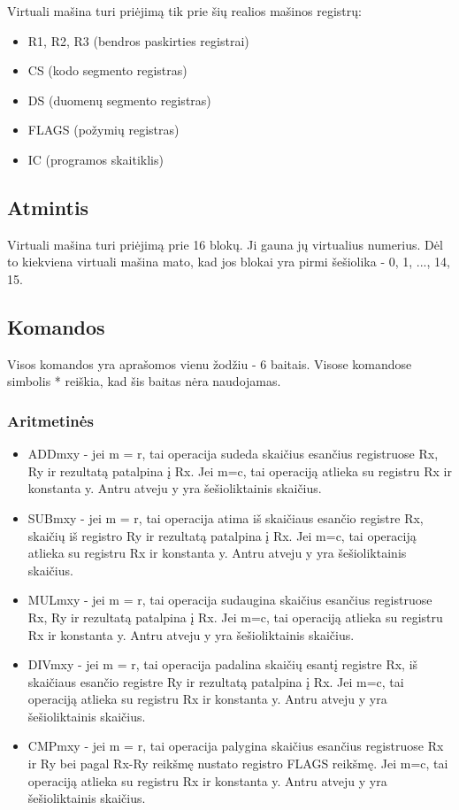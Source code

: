 \documentclass{VUMIFInfKursinis}
\begin{document}
Virtuali mašina turi priėjimą tik prie šių realios mašinos registrų:

\begin{itemize}
	\item R1, R2, R3 (bendros paskirties registrai)
	\item CS (kodo segmento registras)
	\item DS (duomenų segmento registras)
	\item FLAGS (požymių registras)
	\item IC (programos skaitiklis)
\end{itemize}

\subsection{Atmintis}

Virtuali mašina turi priėjimą prie 16 blokų. Ji gauna jų virtualius numerius. Dėl to kiekviena virtuali mašina mato, kad jos blokai yra pirmi šešiolika - 0, 1, ..., 14, 15.

\subsection{Komandos}

Visos komandos yra aprašomos vienu žodžiu - 6 baitais. Visose komandose simbolis * reiškia, kad šis baitas nėra naudojamas.

\subsubsection{Aritmetinės}
\begin{itemize}
	\item ADDmxy - jei m = r, tai operacija sudeda skaičius esančius registruose Rx, Ry ir rezultatą patalpina į Rx. Jei m=c, tai operaciją atlieka su registru Rx ir konstanta y. Antru atveju y yra šešioliktainis skaičius.
	\item SUBmxy - jei m = r, tai operacija atima iš skaičiaus esančio registre Rx, skaičių iš registro Ry ir rezultatą patalpina į Rx. Jei m=c, tai operaciją atlieka su registru Rx ir konstanta y. Antru atveju y yra šešioliktainis skaičius.
	\item MULmxy - jei m = r, tai operacija sudaugina skaičius esančius registruose Rx, Ry ir rezultatą patalpina į Rx. Jei m=c, tai operaciją atlieka su registru Rx ir konstanta y. Antru atveju y yra šešioliktainis skaičius.
	\item DIVmxy - jei m = r, tai operacija padalina skaičių esantį registre Rx, iš skaičiaus esančio registre Ry ir rezultatą patalpina į Rx. Jei m=c, tai operaciją atlieka su registru Rx ir konstanta y. Antru atveju y yra šešioliktainis skaičius.
	\item CMPmxy - jei m = r, tai operacija palygina skaičius esančius registruose Rx ir Ry bei pagal Rx-Ry reikšmę nustato registro FLAGS reikšmę. Jei m=c, tai operaciją atlieka su registru Rx ir konstanta y. Antru atveju y yra šešioliktainis skaičius.
\end{itemize}
\end{document}
